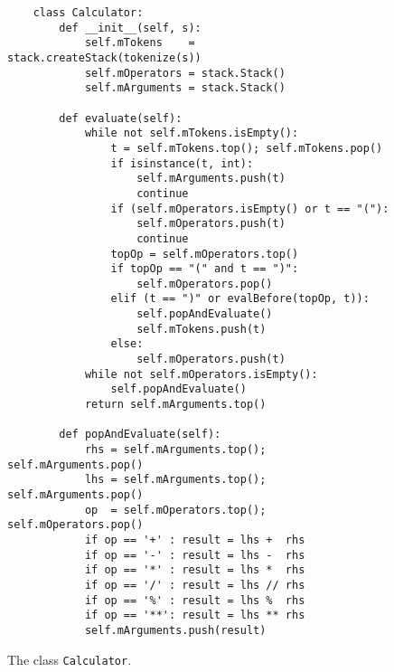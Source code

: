 \begin{figure}[!b]
  \centering
\begin{verbatim}
    class Calculator:
        def __init__(self, s):
            self.mTokens    = stack.createStack(tokenize(s))
            self.mOperators = stack.Stack()
            self.mArguments = stack.Stack()
        
        def evaluate(self):
            while not self.mTokens.isEmpty():
                t = self.mTokens.top(); self.mTokens.pop()
                if isinstance(t, int):
                    self.mArguments.push(t)
                    continue
                if (self.mOperators.isEmpty() or t == "("):
                    self.mOperators.push(t)
                    continue
                topOp = self.mOperators.top()
                if topOp == "(" and t == ")":
                    self.mOperators.pop()
                elif (t == ")" or evalBefore(topOp, t)):
                    self.popAndEvaluate()
                    self.mTokens.push(t)
                else:
                    self.mOperators.push(t)
            while not self.mOperators.isEmpty():
                self.popAndEvaluate()
            return self.mArguments.top()        
    
        def popAndEvaluate(self):
            rhs = self.mArguments.top(); self.mArguments.pop()
            lhs = self.mArguments.top(); self.mArguments.pop()
            op  = self.mOperators.top(); self.mOperators.pop()
            if op == '+' : result = lhs +  rhs
            if op == '-' : result = lhs -  rhs
            if op == '*' : result = lhs *  rhs
            if op == '/' : result = lhs // rhs
            if op == '%' : result = lhs %  rhs
            if op == '**': result = lhs ** rhs
            self.mArguments.push(result) 
\end{verbatim}
\vspace*{-0.3cm}
  \caption{The class \texttt{Calculator}.}
  \label{fig:Calculator.py}
\end{figure} 
 

